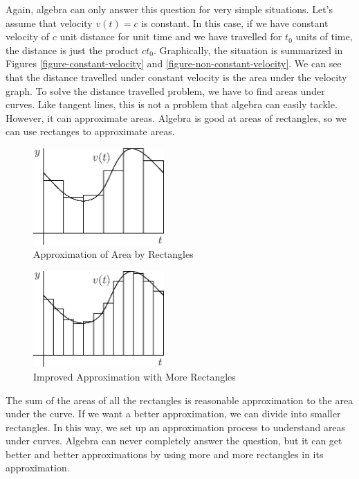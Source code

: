 \documentclass[fleqn]{report}
\begin{document}
Again, algebra can only answer this
question for very simple situations. Let's assume that
velocity $v(t) = c$ is constant. In this case, if we have
constant velocity of $c$ unit distance for unit time and we
have travelled for $t_0$ units of time, the distance is just the
product $ct_0$. Graphically, the situation is summarized in 
Figures \ref{figure-constant-velocity} and
\ref{figure-non-constant-velocity}. We can see that the distance
travelled under constant velocity is the area under the
velocity graph.  To solve the distance travelled problem, we
have to find areas under curves. Like tangent lines, this is
not a problem that algebra can easily tackle. However, it can
approximate areas. Algebra is good at areas of rectangles, so
we can use rectanges to approximate areas.

\begin{figure}[t]
\centering
\includegraphics[width=5cm]{figure16.eps}
\caption{Approximation of Area by Rectangles}
\label{figure-approximation-by-rectangles}
\end{figure}

\begin{figure}[t]
\centering
\includegraphics[width=5cm]{figure17.eps}
\caption{Improved Approximation with More Rectangles}
\label{figure-improved-approximation-by-rectangles}
\end{figure}

The sum of the areas of all the rectangles is reasonable
approximation to the area under the curve. If we want a
better approximation, we can divide into smaller rectangles.
In this way, we set up an approximation process to understand
areas under curves. Algebra can never completely answer the
question, but it can get better and better approximations by
using more and more rectangles in its approximation.
\end{document}

